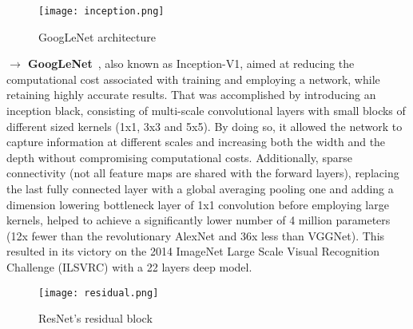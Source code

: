 \documentclass[class=report, crop=false, a4paper, 12pt]{standalone}
\begin{document}
\begin{figure}[!h]
    \centering
    \texttt{[image: inception.png]}
    \caption{GoogLeNet architecture}
    \label{fig:inception}
\end{figure}

\vspace{0.7\baselineskip}
\noindent\textbf{$\rightarrow$ GoogLeNet}~\autocite{szegedyGoingDeeperConvolutions2014}, also known as Inception-V1, aimed at reducing the computational cost associated with training and employing a network, while retaining highly accurate results. That was accomplished by introducing an inception black, consisting of multi-scale convolutional layers with small blocks of different sized kernels (1x1, 3x3 and 5x5). By doing so, it allowed the network to capture information at different scales and increasing both the width and the depth without compromising computational costs. Additionally, sparse connectivity (not all feature maps are shared with the forward layers), replacing the last fully connected layer with a global averaging pooling one and adding a dimension lowering bottleneck layer of 1x1 convolution before employing large kernels, helped to achieve a significantly lower number of 4 million parameters (12x fewer than the revolutionary AlexNet and 36x less than VGGNet). This resulted in its victory on the 2014 ImageNet Large Scale Visual Recognition Challenge (ILSVRC) with a 22 layers deep model.

\begin{figure}[!h]
    \centering
    \texttt{[image: residual.png]}
    \caption{ResNet's residual block}
    \label{fig:residual}
\end{figure}
\end{document}
